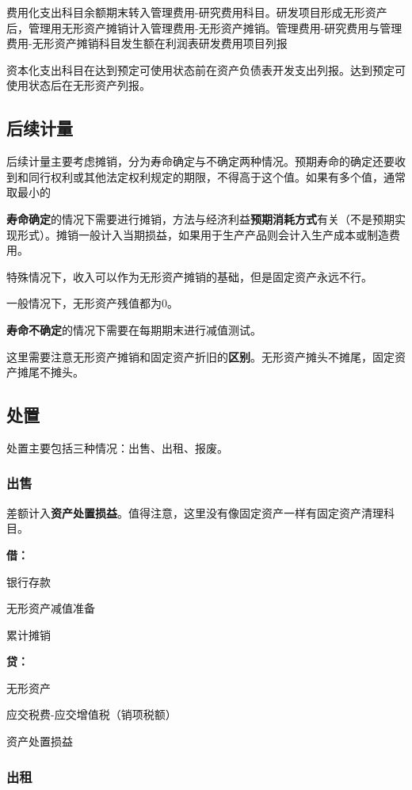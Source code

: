 \documentclass[UTF8,12pt]{ctexart}
\newenvironment{Dr}{%
	\begin{list}{}%
		{
			\setlength{\leftmargin}{2em}
			\setlength{\labelwidth}{2em}
			\setlength{\labelsep}{0pt}
			\setlength{\itemindent}{0pt}
			\setlength{\listparindent}{0pt}
			\setlength{\parsep}{0pt}
			\setlength{\topsep}{0pt}
		}
		\item[\textbf{借：}]
	}{%
	\end{list}
}
\newenvironment{Cr}{%
	\begin{list}{}%
		{
			\setlength{\leftmargin}{2em}
			\setlength{\labelwidth}{2em}
			\setlength{\labelsep}{0pt}
			\setlength{\itemindent}{0pt}
			\setlength{\listparindent}{0pt}
			\setlength{\parsep}{0pt}
			\setlength{\topsep}{0pt}
		}
		\item[\textbf{贷：}]
	}{%
	\end{list}
}
\numberwithin{equation}{section} %
\numberwithin{figure}{section}
\numberwithin{table}{section}
\begin{document}
	费用化支出科目余额期末转入管理费用-研究费用科目。研发项目形成无形资产后，管理用无形资产摊销计入管理费用-无形资产摊销。管理费用-研究费用与管理费用-无形资产摊销科目发生额在利润表研发费用项目列报
	
	资本化支出科目在达到预定可使用状态前在资产负债表开发支出列报。达到预定可使用状态后在无形资产列报。
	
	
	
	\subsection{后续计量}
	后续计量主要考虑摊销，分为寿命确定与不确定两种情况。预期寿命的确定还要收到和同行权利或其他法定权利规定的期限，不得高于这个值。如果有多个值，通常取最小的
	
	\textbf{寿命确定}的情况下需要进行摊销，方法与经济利益\textbf{预期消耗方式}有关（不是预期实现形式）。摊销一般计入当期损益，如果用于生产产品则会计入生产成本或制造费用。
	
	特殊情况下，收入可以作为无形资产摊销的基础，但是固定资产永远不行。
	
	一般情况下，无形资产残值都为0。
	
	\textbf{寿命不确定}的情况下需要在每期期末进行减值测试。
	
	这里需要注意无形资产摊销和固定资产折旧的\textbf{区别}。无形资产摊头不摊尾，固定资产摊尾不摊头。
	
	\subsection{处置}
	
	处置主要包括三种情况：出售、出租、报废。
	
	\subsubsection{出售}
	差额计入\textbf{资产处置损益}。值得注意，这里没有像固定资产一样有固定资产清理科目。
	
	\begin{Dr}
		银行存款
		
		无形资产减值准备
		
		累计摊销
	\end{Dr}
	\begin{Cr}
		无形资产
		
		应交税费-应交增值税（销项税额）
		
		资产处置损益
	\end{Cr}
	
	\subsubsection{出租}
	
\end{document}
